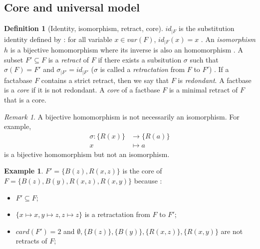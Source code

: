\documentclass{article}
\theoremstyle{definition}
\newtheorem{definition}{Definition}[section]
\newtheorem{example}{Example}[section]
\theoremstyle{remark}
\newtheorem{remark}{Remark}[section]
\begin{document}
\subsection{Core and universal model}

\begin{definition}[Identity, isomorphism, retract, core]
$id_{|F}$ is the substitution identity defined by : for all variable $x \in var(F)$, $id_{|F}(x) = x$ . An \emph{isomorphism} $h$ is a bijective homomorphism where its inverse is also an homomorphism . A subset $F' \subseteq F$ is a \emph{retract} of $F$ if there exists a subsitution $\sigma$ such that $\sigma(F) = F'$ and $\sigma_{|F'}=id_{|F'}$ %
($\sigma$ is called a \emph{retractation} from $F$ to $F'$) . If a factabase $F$ contains a strict retract, then we say that $F$ is \emph{redondant}. A factbase is a \emph{core} if it is not redondant. A \emph{core} of a factbase $F$ is a minimal retract of $F$ that is a core.
\end{definition}

\begin{remark}
A bijective homomorphism is not necessarily an isomorphism. For example, 
\begin{align*}
\sigma:\{R(x)\} &\to \{R(a)\}\\
x &\mapsto a
\end{align*}
is a bijective homomorphism but not an isomorphism.
\end{remark}

\begin{example}
$F' = \{B(z),R(x,z)\}$ is the core of $F = \{B(z),B(y),R(x,z),R(x,y)\}$ because : 
\begin{itemize}
\item $F' \subseteq F$;
\item $\{x \mapsto x, y \mapsto z, z \mapsto z\}$ is a retractation from $F$ to $F'$;
\item $card(F') = 2$ and $\emptyset, \{B(z)\},\{B(y)\},\{R(x,z)\},\{R(x,y)\}$ are not retracts of $F$;
\end{itemize}
\end{example}
\end{document}
